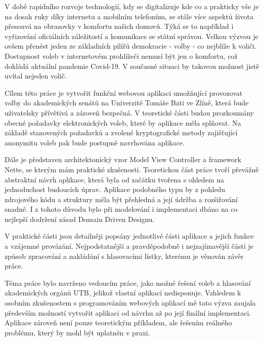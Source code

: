 
V době rapidního rozvoje technologií, kdy se digitalizuje kde co a prakticky vše je na dosah ruky díky internetu a mobilním telefonům, se stále více aspektů života přesouvá na obrazovky v komfortu našich domovů. Týká se to například i vyřizování oficiálních záležitostí a komunikace se státní správou. Velkou výzvou je ovšem přenést jeden ze základních pilířů demokracie - volby - co nejblíže k voliči. Dostupnost voleb v internetovém prohlížeči nemusí být jen o komfortu, což dokládá aktuální pandemie Covid-19. V současné situaci by takovou možnost jistě uvítal nejeden volič.

Cílem této práce je vytvořit funkční webovou aplikaci umožňující provozovat volby do akademických senátů na Univerzitě Tomáše Bati ve Zlíně, která bude uživatelsky přívětivá a zároveň bezpečná. V teoretické části budou prozkoumány obecné požadavky elektronických voleb, které by aplikace měla splňovat. Na základě stanovených požadavků a zvolené kryptografické metody zajišťující anonymitu voleb pak bude postupně navrhována aplikace.

Dále je představen architektonický vzor Model View Controller a framework Nette, se kterým mám praktické zkušenosti. Teoretickou část práce tvoří převážně abstraktní návrh aplikace, která byla od začátku tvořena s ohledem na jednoduchost budoucích úprav. Aplikace podobného typu by z pohledu zdrojového kódu a struktury měla být přehledná a její údržba a rozšiřování snadné. I z tohoto důvodu bylo při modelování i implementaci dbáno na co nejlepší dodržení zásad Domain Driven Designu.

V praktické části jsou detailněji popsány jednotlivé části aplikace a jejich funkce a vzájemné provázání. Nejpodstatnější a pravděpodobně i nejzajímavější částí je způsob zpracování a nakládání s hlasovacími lístky, kterému je věnován závěr práce.

Téma práce bylo navrženo vedoucím práce, jako možné řešení voleb a hlasování akademických orgánů UTB, jelikož vlastní aplikací nedisponuje. Vzhledem k osobním zkušenostem s programováním webových aplikací mě tato výzva zaujala především možností vytvořit aplikaci od návrhu až po její finální implementaci. Aplikace zároveň není pouze teoretickým příkladem, ale řešením reálného problému, který by mohl být uplatněn v praxi.

